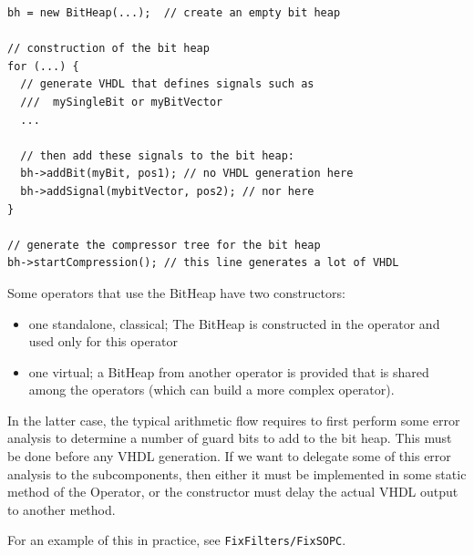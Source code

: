 \documentclass{article}
\begin{document}
\begin{lstlisting}[float, caption=Typical code for an operator involving a bit heap, label=algo:code-bitheap]
bh = new BitHeap(...);  // create an empty bit heap

// construction of the bit heap
for (...) {
  // generate VHDL that defines signals such as
  ///  mySingleBit or myBitVector
  ...
  
  // then add these signals to the bit heap: 
  bh->addBit(myBit, pos1); // no VHDL generation here 
  bh->addSignal(mybitVector, pos2); // nor here
}

// generate the compressor tree for the bit heap
bh->startCompression(); // this line generates a lot of VHDL
\end{lstlisting}


Some operators that use the BitHeap have two constructors:
\begin{itemize}
	\item one standalone, classical; The BitHeap is constructed in the operator and used only for this operator
	\item one virtual; a BitHeap from another operator is provided that is shared among the operators (which can build a more complex operator).
\end{itemize}

In the latter case, the typical arithmetic flow requires to first perform some error analysis to determine a number of guard bits to add to the bit heap.
This must be done before any VHDL generation.
If we want to delegate some of this error analysis to the subcomponents, then either it must be implemented in some static method of the Operator, or the constructor must delay the actual VHDL output to another method.

For an example of this in practice, see \texttt{FixFilters/FixSOPC}.
\end{document}
